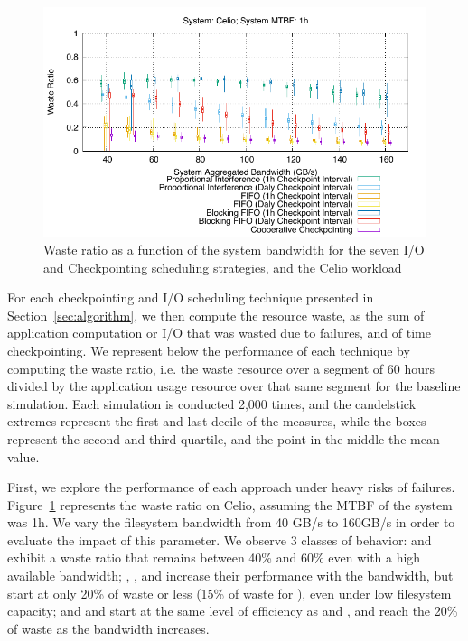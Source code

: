 \begin{figure}
  \begin{center}
    \includegraphics[width=\linewidth]{sim/figures/synthetic-01hMTBF-waste-celio.pdf}
  \end{center}
  \caption{Waste ratio as a function of the system bandwidth for the
    seven I/O and Checkpointing scheduling strategies, and the Celio
    workload \label{fig:celio-1hmtbf}}
\end{figure}

For each checkpointing and I/O scheduling technique presented in
Section~\ref{sec:algorithm}, we then compute the resource waste, as
the sum of application computation or I/O that was wasted due to
failures, and of time checkpointing. We represent below the
performance of each technique by computing the waste ratio, i.e. the
waste resource over a segment of 60 hours divided by the application
usage resource over that same segment for the baseline
simulation. Each simulation is conducted 2,000 times, and the
candelstick extremes represent the first and last decile of the
measures, while the boxes represent the second and third quartile, and
the point in the middle the mean value.

First, we explore the performance of each approach under heavy risks
of failures. Figure~\ref{fig:celio-1hmtbf} represents the waste ratio on Celio,
assuming the MTBF of the system was 1h. We vary the filesystem
bandwidth from 40 GB/s to 160GB/s in order to evaluate the impact of
this parameter. We observe 3 classes of behavior: \propfixed and
\bfifofixed exhibit a waste ratio that remains between 40\% and 60\%
even with a high available bandwidth; \fifodaly, \fifofixed, and
\cooperative increase their performance with the bandwidth, but start
at only 20\% of waste or less (15\% of waste for \cooperative), even
under low filesystem capacity; and \propdaly and \bfifodaly start
at the same level of efficiency as \propfixed and \bfifofixed, and
reach the 20\% of waste as the bandwidth increases. 

